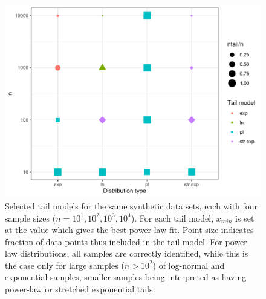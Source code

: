 \documentclass[
  12pt,
  a4paper, twoside]{book}
\begin{document}
\begin{figure}

{\centering \includegraphics[width=0.9\linewidth]{bookdown-demo_files/figure-latex/05-tails-1} 

}

\caption[Sample size and selected tail model]{Selected tail models for the same synthetic data sets, each with four sample sizes (\(n=10^1, 10^2, 10^3, 10^4\)). For each tail model, \(x_{min}\) is set at the value which gives the best power-law fit. Point size indicates fraction of data points thus included in the tail model. For power-law distributions, all samples are correctly identified, while this is the case only for large samples (\(n>10^2\)) of log-normal and exponential samples, smaller samples being interpreted as having power-law or stretched exponential tails}\label{fig:05-tails}
\end{figure}
\end{document}
